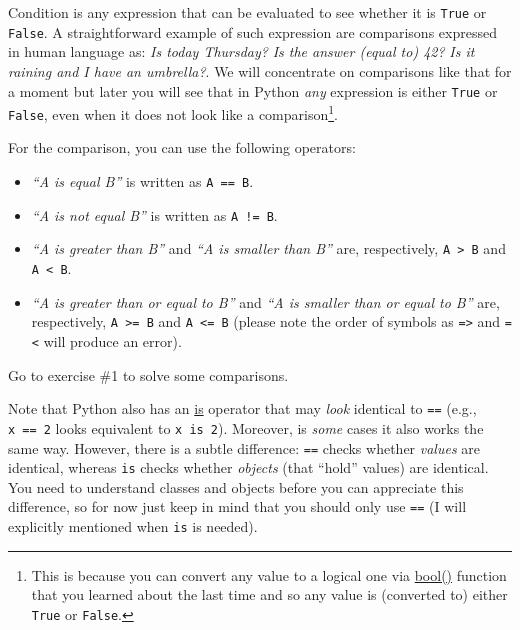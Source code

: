 \documentclass[
]{book}
\providecommand{\tightlist}{%
  \setlength{\itemsep}{0pt}\setlength{\parskip}{0pt}}
\begin{document}
Condition is any expression that can be evaluated to see whether it is \texttt{True} or \texttt{False}. A straightforward example of such expression are comparisons expressed in human language as: \emph{Is today Thursday?} \emph{Is the answer (equal to) 42?} \emph{Is it raining and I have an umbrella?}. We will concentrate on comparisons like that for a moment but later you will see that in Python \emph{any} expression is either \texttt{True} or \texttt{False}, even when it does not look like a comparison\footnote{This is because you can convert any value to a logical one via \href{https://docs.python.org/3/library/functions.html\#bool}{bool()} function that you learned about the last time and so any value is (converted to) either \texttt{True} or \texttt{False}.}.

For the comparison, you can use the following operators:

\begin{itemize}
\tightlist
\item
  \emph{``A is equal B''} is written as \texttt{A\ ==\ B}.
\item
  \emph{``A is not equal B''} is written as \texttt{A\ !=\ B}.
\item
  \emph{``A is greater than B''} and \emph{``A is smaller than B''} are, respectively, \texttt{A\ \textgreater{}\ B} and \texttt{A\ \textless{}\ B}.
\item
  \emph{``A is greater than or equal to B''} and \emph{``A is smaller than or equal to B''} are, respectively, \texttt{A\ \textgreater{}=\ B} and \texttt{A\ \textless{}=\ B} (please note the order of symbols as \texttt{=\textgreater{}} and \texttt{=\textless{}} will produce an error).
\end{itemize}

Go to exercise \#1 to solve some comparisons.

Note that Python also has an \href{https://docs.python.org/3/library/operator.html\#operator.is_}{is} operator that may \emph{look} identical to \texttt{==} (e.g., \texttt{x\ ==\ 2} looks equivalent to \texttt{x\ is\ 2}). Moreover, is \emph{some} cases it also works the same way. However, there is a subtle difference: \texttt{==} checks whether \emph{values} are identical, whereas \texttt{is} checks whether \emph{objects} (that ``hold'' values) are identical. You need to understand classes and objects before you can appreciate this difference, so for now just keep in mind that you should only use \texttt{==} (I will explicitly mentioned when \texttt{is} is needed).
\end{document}
